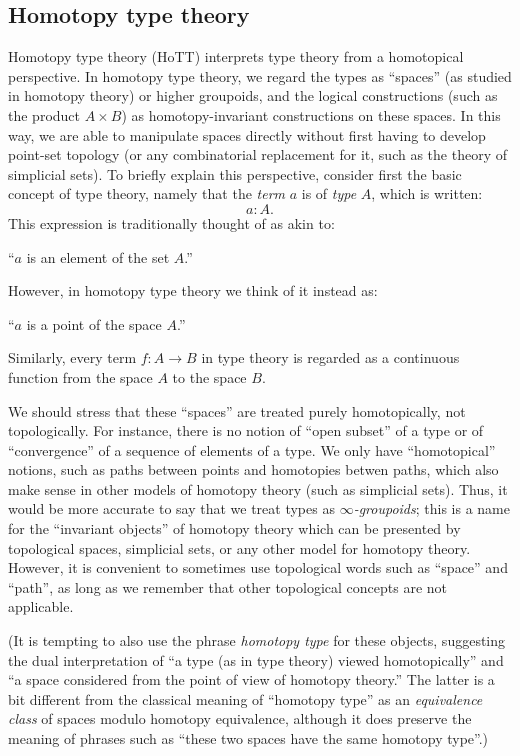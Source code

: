 \subsection*{Homotopy type theory}

Homotopy type theory (HoTT) interprets type theory from a homotopical perspective.
In homotopy type theory, we regard the types as ``spaces'' (as studied in homotopy theory) or higher groupoids, and the logical constructions (such as the product $A\times B$) as homotopy-invariant constructions on these spaces.
In this way, we are able to manipulate spaces directly without first having to develop point-set topology (or any combinatorial replacement for it, such as the theory of simplicial sets).
To briefly explain this perspective, consider first the basic concept of type theory, namely that
the \emph{term} $a$ is of \emph{type} $A$, which is written:
\[ a:A. \]
This expression is traditionally thought of as akin to:
\begin{center}
``$a$ is an element of the set $A$.''
\end{center}
However, in homotopy type theory we think of it instead as:
\begin{center}
``$a$ is a point of the space $A$.''
\end{center}
Similarly, every term $f : A\to B$ in type theory is regarded as a continuous function from the space $A$ to the space $B$.

We should stress that these ``spaces'' are treated purely homotopically, not topologically.
For instance, there is no notion of ``open subset'' of a type or of ``convergence'' of a sequence of elements of a type.
We only have ``homotopical'' notions, such as paths between points and homotopies betwen paths, which also make sense in other models of homotopy theory (such as simplicial sets).
Thus, it would be more accurate to say that we treat types as \emph{$\infty$-groupoids}; this is a name for the ``invariant objects'' of homotopy theory which can be presented by topological spaces, simplicial sets, or any other model for homotopy theory.
However, it is convenient to sometimes use topological words such as ``space'' and ``path'', as long as we remember that other topological concepts are not applicable.

(It is tempting to also use the phrase \emph{homotopy type} for these objects, suggesting the dual interpretation of ``a type (as in type theory) viewed homotopically'' and ``a space considered from the point of view of homotopy theory.''
The latter is a bit different from the classical meaning of ``homotopy type'' as an \emph{equivalence class} of spaces modulo homotopy equivalence, although it does preserve the meaning of phrases such as ``these two spaces have the same homotopy type''.)

